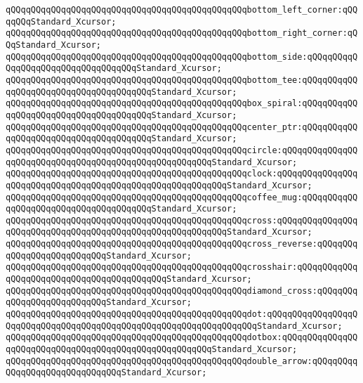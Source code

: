 \verb|qQQqqQQqqQQqqQQqqQQqqQQqqQQqqQQqqQQqqQQqqQQqqQQqbottom_left_corner:qQQqqQQqStandard_Xcursor;|\newline
\verb|qQQqqQQqqQQqqQQqqQQqqQQqqQQqqQQqqQQqqQQqqQQqqQQqbottom_right_corner:qQQqStandard_Xcursor;|\newline
\verb|qQQqqQQqqQQqqQQqqQQqqQQqqQQqqQQqqQQqqQQqqQQqqQQqbottom_side:qQQqqQQqqQQqqQQqqQQqqQQqqQQqqQQqqQQqStandard_Xcursor;|\newline
\verb|qQQqqQQqqQQqqQQqqQQqqQQqqQQqqQQqqQQqqQQqqQQqqQQqbottom_tee:qQQqqQQqqQQqqQQqqQQqqQQqqQQqqQQqqQQqqQQqStandard_Xcursor;|\newline
\verb|qQQqqQQqqQQqqQQqqQQqqQQqqQQqqQQqqQQqqQQqqQQqqQQqbox_spiral:qQQqqQQqqQQqqQQqqQQqqQQqqQQqqQQqqQQqqQQqStandard_Xcursor;|\newline
\verb|qQQqqQQqqQQqqQQqqQQqqQQqqQQqqQQqqQQqqQQqqQQqqQQqcenter_ptr:qQQqqQQqqQQqqQQqqQQqqQQqqQQqqQQqqQQqqQQqStandard_Xcursor;|\newline
\verb|qQQqqQQqqQQqqQQqqQQqqQQqqQQqqQQqqQQqqQQqqQQqqQQqcircle:qQQqqQQqqQQqqQQqqQQqqQQqqQQqqQQqqQQqqQQqqQQqqQQqqQQqqQQqStandard_Xcursor;|\newline
\verb|qQQqqQQqqQQqqQQqqQQqqQQqqQQqqQQqqQQqqQQqqQQqqQQqclock:qQQqqQQqqQQqqQQqqQQqqQQqqQQqqQQqqQQqqQQqqQQqqQQqqQQqqQQqqQQqStandard_Xcursor;|\newline
\verb|qQQqqQQqqQQqqQQqqQQqqQQqqQQqqQQqqQQqqQQqqQQqqQQqcoffee_mug:qQQqqQQqqQQqqQQqqQQqqQQqqQQqqQQqqQQqqQQqStandard_Xcursor;|\newline
\verb|qQQqqQQqqQQqqQQqqQQqqQQqqQQqqQQqqQQqqQQqqQQqqQQqcross:qQQqqQQqqQQqqQQqqQQqqQQqqQQqqQQqqQQqqQQqqQQqqQQqqQQqqQQqqQQqStandard_Xcursor;|\newline
\verb|qQQqqQQqqQQqqQQqqQQqqQQqqQQqqQQqqQQqqQQqqQQqqQQqcross_reverse:qQQqqQQqqQQqqQQqqQQqqQQqqQQqStandard_Xcursor;|\newline
\verb|qQQqqQQqqQQqqQQqqQQqqQQqqQQqqQQqqQQqqQQqqQQqqQQqcrosshair:qQQqqQQqqQQqqQQqqQQqqQQqqQQqqQQqqQQqqQQqqQQqStandard_Xcursor;|\newline
\verb|qQQqqQQqqQQqqQQqqQQqqQQqqQQqqQQqqQQqqQQqqQQqqQQqdiamond_cross:qQQqqQQqqQQqqQQqqQQqqQQqqQQqStandard_Xcursor;|\newline
\verb|qQQqqQQqqQQqqQQqqQQqqQQqqQQqqQQqqQQqqQQqqQQqqQQqdot:qQQqqQQqqQQqqQQqqQQqqQQqqQQqqQQqqQQqqQQqqQQqqQQqqQQqqQQqqQQqqQQqqQQqStandard_Xcursor;|\newline
\verb|qQQqqQQqqQQqqQQqqQQqqQQqqQQqqQQqqQQqqQQqqQQqqQQqdotbox:qQQqqQQqqQQqqQQqqQQqqQQqqQQqqQQqqQQqqQQqqQQqqQQqqQQqqQQqStandard_Xcursor;|\newline
\verb|qQQqqQQqqQQqqQQqqQQqqQQqqQQqqQQqqQQqqQQqqQQqqQQqdouble_arrow:qQQqqQQqqQQqqQQqqQQqqQQqqQQqqQQqStandard_Xcursor;|\newline
